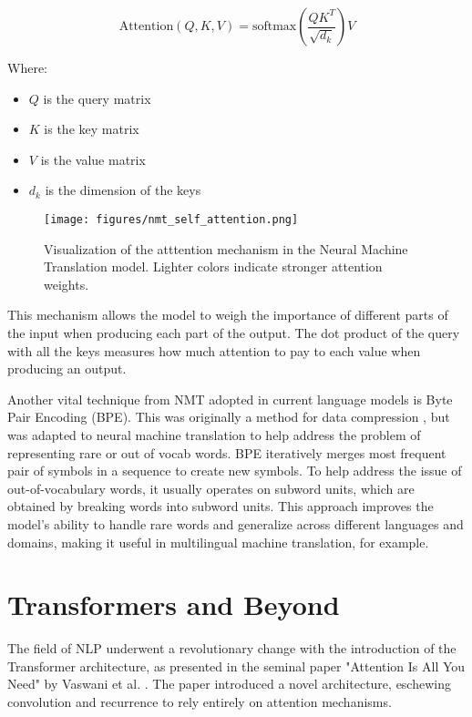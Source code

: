 \documentclass[a4paper, oneside]{discothesis}
\begin{document}
\begin{equation}
\text{Attention}(Q, K, V) = \text{softmax}\left(\frac{QK^T}{\sqrt{d_k}}\right)V
\end{equation}

Where:
\begin{itemize}
    \item $Q$ is the query matrix
    \item $K$ is the key matrix
    \item $V$ is the value matrix
    \item $d_k$ is the dimension of the keys
\end{itemize}

\begin{figure}[h]
    \centering
    \texttt{[image: figures/nmt\_self\_attention.png]}
    \caption{Visualization of the atttention mechanism in the Neural Machine Translation model. Lighter colors indicate stronger attention weights.}
    \label{fig:nmt_self_attention}
\end{figure}

This mechanism allows the model to weigh the importance of different parts of the input when producing each part of the output. The dot product of the query with all the keys measures how much attention to pay to each value when producing an output.

Another vital technique from NMT adopted in current language models is Byte Pair Encoding (BPE). This was originally a method for data compression \cite{PhilipGage1994}, but was adapted to neural machine translation to help address the problem of representing rare or out of vocab words\cite{sennrich2015neural}. BPE iteratively merges most frequent pair of symbols in a sequence to create new symbols. To help address the issue of out-of-vocabulary words, it usually operates on subword units, which are obtained by breaking words into subword units. This approach improves the model's ability to handle rare words and generalize across different languages and domains, making it useful in multilingual machine translation, for example.

\section{Transformers and Beyond}
The field of NLP underwent a revolutionary change with the introduction of the Transformer architecture, as presented in the seminal paper "Attention Is All You Need" by Vaswani et al. \cite{vaswani2017attention}. The paper introduced a novel architecture, eschewing convolution and recurrence to rely entirely on attention mechanisms.
\end{document}
